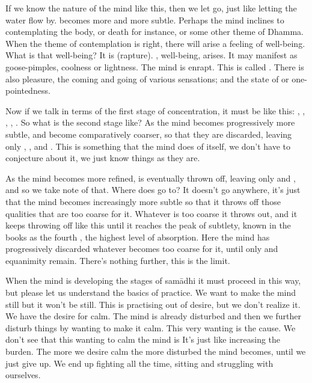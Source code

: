 If we know the nature of the mind like this, then we let go, just like letting the water flow by.  becomes more and more subtle. Perhaps the mind inclines to contemplating the body, or death for instance, or some other theme of Dhamma. When the theme of contemplation is right, there will arise a feeling of well-being. What is that well-being? It is  (rapture). , well-being, arises. It may manifest as goose-pimples, coolness or lightness. The mind is enrapt. This is called . There is also pleasure,  the coming and going of various sensations; and the state of  or one-pointedness.

Now if we talk in terms of the first stage of concentration, it must be like this: , , , , . So what is the second stage like? As the mind becomes progressively more subtle,  and  become comparatively coarser, so that they are discarded, leaving only , , and . This is something that the mind does of itself, we don't have to conjecture about it, we just know things as they are. 

As the mind becomes more refined,  is eventually thrown off, leaving only  and , and so we take note of that. Where does  go to? It doesn't go anywhere, it's just that the mind becomes increasingly more subtle so that it throws off those qualities that are too coarse for it. Whatever is too coarse it throws out, and it keeps throwing off like this until it reaches the peak of subtlety, known in the books as the fourth , the highest level of absorption. Here the mind has progressively discarded whatever becomes too coarse for it, until only  and  equanimity remain. There's nothing further, this is the limit. 

When the mind is developing the stages of sam\=adhi it must proceed in this way, but please let us understand the basics of practice. We want to make the mind still but it won't be still. This is practising out of desire, but we don't realize it. We have the desire for calm. The mind is already disturbed and then we further disturb things by wanting to make it calm. This very wanting is the cause. We don't see that this wanting to calm the mind is  It's just like increasing the burden. The more we desire calm the more disturbed the mind becomes, until we just give up. We end up fighting all the time, sitting and struggling with ourselves. 

